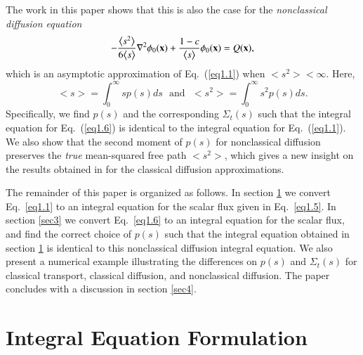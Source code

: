 \documentclass[preprint,12pt]{elsarticle}
\newcommand{\bl}{\big<}
\newcommand{\bg}{\big>}
\newcommand{\ux}{{\bf x}}
\begin{document}
The work in this paper shows that this is also the case for the \textit{nonclassical diffusion equation} \cite{larsen_11}
\begin{equation}
\label{eq1.6}
-\frac{\bl s^2\bg}{6\bl s\bg} \nabla^2 \phi_0(\ux) + \frac{1-c}{\bl s\bg} \phi_0(\ux) = Q(\ux),
\end{equation}
which is an asymptotic approximation of Eq.\ (\ref{eq1.1}) when $\bl s^2\bg < \infty$.
Here,
\begin{equation}
\label{eq1.7}
\bl s\bg = \int_0^{\infty} sp(s)ds \,\,\,\, \text{and} \,\,\,\, \bl s^2\bg = \int_0^{\infty} s^2p(s)ds.
\end{equation}
Specifically, we find $p(s)$ and the corresponding $\Sigma_t(s)$ such that the integral equation for Eq.\ (\ref{eq1.6}) is identical to the integral equation for Eq.\ (\ref{eq1.1}). We also show that the second moment of $p(s)$ for nonclassical diffusion preserves the \textit{true} mean-squared free path $\bl s^2\bg$, which gives a new insight on the results obtained in \cite{siap15} for the classical diffusion approximations.

The remainder of this paper is organized as follows. In section \ref{sec2} we convert Eq.\ \eqref{eq1.1} to an integral equation for the scalar flux given in Eq.\ \eqref{eq1.5}. In section \ref{sec3} we convert Eq.\ \eqref{eq1.6} to an integral equation for the scalar flux, and find the correct choice of $p(s)$ such that the integral equation obtained in section \ref{sec2} is identical to this nonclassical diffusion integral equation. We also present a numerical example illustrating the differences on $p(s)$ and $\Sigma_t(s)$ for classical transport, classical diffusion, and nonclassical diffusion. The paper concludes with a discussion in section \ref{sec4}.


\section{Integral Equation Formulation}\label{sec2}
\setcounter{section}{2}
\setcounter{equation}{0} 
\end{document}
